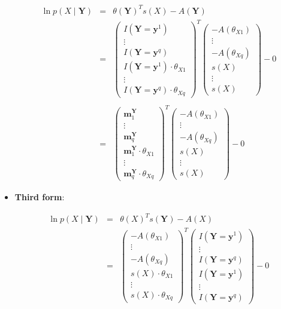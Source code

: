\documentclass[11pt, oneside]{article}   	%
\numberwithin{figure}{section}
\numberwithin{equation}{section}
\numberwithin{table}{section}
\begin{document}
\begin{itemize}
\begin{eqnarray*}
\ln p(X \mid \mathbf{Y} ) &=& \theta(\mathbf{Y} )^T s(X) - A(\mathbf{Y} ) \\
&=&
\begin{pmatrix}
I(\mathbf{Y} =\mathbf{y}^1)\\
\vdots \\
I(\mathbf{Y} =\mathbf{y}^q)\\
I(\mathbf{Y} =\mathbf{y}^1) \cdot \theta_{X1}\\
\vdots \\
I(\mathbf{Y} =\mathbf{y}^q) \cdot \theta_{Xq}
\end{pmatrix}^T
\begin{pmatrix}
- A(\theta_{X1}) \\
\vdots \\
- A(\theta_{Xq}) \\
s(X) \\
\vdots \\
s(X) 
\end{pmatrix}
- 0 \\\\
&=&
\begin{pmatrix}
\mathbf{m}^\mathbf{Y}_1\\
\vdots \\
\mathbf{m}^\mathbf{Y}_q \\
\mathbf{m}^\mathbf{Y}_1 \cdot \theta_{X1}\\
\vdots \\
\mathbf{m}^\mathbf{Y}_q \cdot \theta_{Xq}
\end{pmatrix}^T
\begin{pmatrix}
- A(\theta_{X1}) \\
\vdots \\
- A(\theta_{Xq}) \\
s(X) \\
\vdots \\
s(X) 
\end{pmatrix}
- 0 
\end{eqnarray*}

\item \textbf{Third form}:

\begin{eqnarray*}
\ln p(X \mid \mathbf{Y}) &=& \theta(X)^T s(\mathbf{Y}) - A(X) \\
&=&
\begin{pmatrix}
- A(\theta_{X1}) \\
\vdots \\
- A(\theta_{Xq})\\
s(X) \cdot \theta_{X1}\\
\vdots \\
s(X) \cdot \theta_{Xq}
\end{pmatrix}^T
\begin{pmatrix}
I(\mathbf{Y} =\mathbf{y}^1) \\
\vdots \\
I(\mathbf{Y} =\mathbf{y}^q) \\
I(\mathbf{Y} =\mathbf{y}^1) \\
\vdots \\
I(\mathbf{Y} =\mathbf{y}^q)
\end{pmatrix}
- 0
\end{eqnarray*}


\end{itemize}
\end{document}

